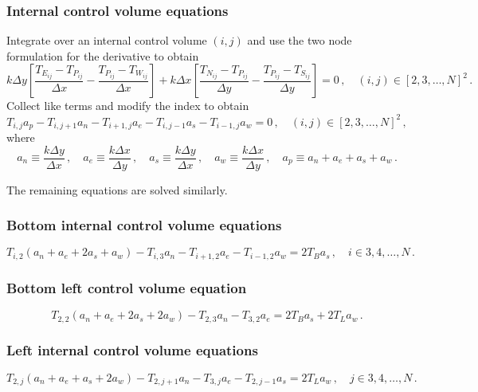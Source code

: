 \documentclass{article}
\begin{document}
\subsubsection*{Internal control volume equations}

Integrate over an internal control volume $(i,j)$ and use the two node formulation for the derivative to obtain
\[
	k \Delta y \left[\frac{T_{E_{ij}} - T_{P_{ij}}}{\Delta x} - \frac{T_{P_{ij}} - T_{W_{ij}}}{\Delta x}\right] + k \Delta x \left[ \frac{T_{N_{ij}} - T_{P_{ij}}}{\Delta y} -\frac{T_{P_{ij}} - T_{S_{ij}}}{\Delta y} \right] = 0\,, \quad (i, j) \in [2, 3, \ldots, N]^2\,.
\]
Collect like terms and modify the index to obtain
\begin{equation}
	\label{eq:internal}
	T_{i,j} a_p - T_{i, j+1} a_n - T_{i+1, j} a_e - T_{i, j-1} a_s - T_{i-1, j} a_w = 0\,,\quad (i, j) \in [2, 3, \ldots, N]^2\,,
\end{equation}
where
\[
	a_n \equiv \frac{k \Delta y}{\Delta x}\,, \quad a_e \equiv \frac{k \Delta x}{\Delta y}\,, \quad a_s \equiv \frac{k\Delta y}{\Delta x}\,, \quad a_w \equiv \frac{k\Delta x}{\Delta y}\,, \quad a_p \equiv a_n + a_e + a_s + a_w\,.
\]

The remaining equations are solved similarly.

\subsubsection*{Bottom internal control volume equations}

\begin{equation}
	T_{i,2} (a_n + a_e + 2a_s + a_w) - T_{i,3} a_n - T_{i+1,2} a_e - T_{i-1, 2} a_w = 2 T_B a_s\,, \quad i \in 3, 4, \ldots, N\,.
\end{equation}

\subsubsection*{Bottom left control volume equation}
\begin{equation}
	\label{eq:bot_left}
	T_{2,2} (a_n + a_e + 2 a_s + 2 a_w) - T_{2,3} a_n - T_{3,2} a_e = 2 T_B a_s + 2 T_L a_w\,.
\end{equation}

\subsubsection*{Left internal control volume equations}

\begin{equation}
	T_{2,j} (a_n + a_e + a_s + 2a_w) - T_{2,j+1} a_n - T_{3,j}a_e - T_{2,j-1} a_s = 2 T_L a_w\,, \quad j \in 3, 4, \ldots, N\,.
\end{equation}
\end{document}
